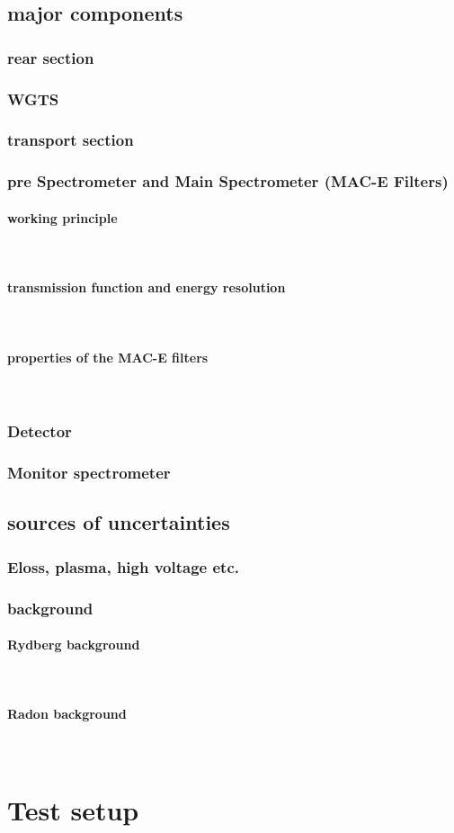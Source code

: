 \documentclass[11pt]{article} %
\newcommand{\subsubsubsection}[1]{\paragraph{#1}\mbox{}\\}
\begin{document}
	\subsection{major components}
		\subsubsection{rear section}
		\subsubsection{WGTS}
		\subsubsection{transport section}
		\subsubsection{pre Spectrometer and Main Spectrometer (MAC-E Filters)}
			\subsubsubsection{working principle}
			\subsubsubsection{transmission function and energy resolution} 
			\subsubsubsection{properties of the MAC-E filters}
		\subsubsection{Detector}
		\subsubsection{Monitor spectrometer}

\subsection{sources of uncertainties}
	\subsubsection{Eloss, plasma, high voltage etc.}
	\subsubsection{background}
		\subsubsubsection{Rydberg background}
		\subsubsubsection{Radon background}


\newpage
\section{Test setup}
\end{document}
